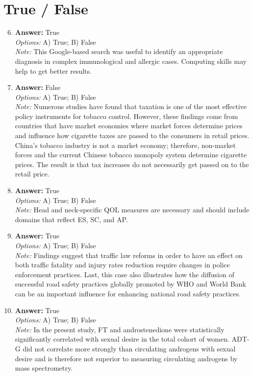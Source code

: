 \documentclass[12pt]{article}
\begin{document}
\section*{True / False}
\begin{enumerate}[label=\arabic*.]
\setcounter{enumi}{5}
\item \textbf{Answer:} True
\\ \textit{Options:} A) True; B) False
\\ \textit{Note:} This Google-based search was useful to identify an appropriate diagnosis in complex immunological and allergic cases. Computing skills may help to get better results.
\item \textbf{Answer:} False
\\ \textit{Options:} A) True; B) False
\\ \textit{Note:} Numerous studies have found that taxation is one of the most effective policy instruments for tobacco control. However, these findings come from countries that have market economies where market forces determine prices and influence how cigarette taxes are passed to the consumers in retail prices. China's tobacco industry is not a market economy; therefore, non-market forces and the current Chinese tobacco monopoly system determine cigarette prices. The result is that tax increases do not necessarily get passed on to the retail price.
\item \textbf{Answer:} True
\\ \textit{Options:} A) True; B) False
\\ \textit{Note:} Head and neck-specific QOL measures are necessary and should include domains that reflect ES, SC, and AP.
\item \textbf{Answer:} True
\\ \textit{Options:} A) True; B) False
\\ \textit{Note:} Findings suggest that traffic law reforms in order to have an effect on both traffic fatality and injury rates reduction require changes in police enforcement practices. Last, this case also illustrates how the diffusion of successful road safety practices globally promoted by WHO and World Bank can be an important influence for enhancing national road safety practices.
\item \textbf{Answer:} True
\\ \textit{Options:} A) True; B) False
\\ \textit{Note:} In the present study, FT and androstenedione were statistically significantly correlated with sexual desire in the total cohort of women. ADT-G did not correlate more strongly than circulating androgens with sexual desire and is therefore not superior to measuring circulating androgens by mass spectrometry.
\end{enumerate}
\end{document}
